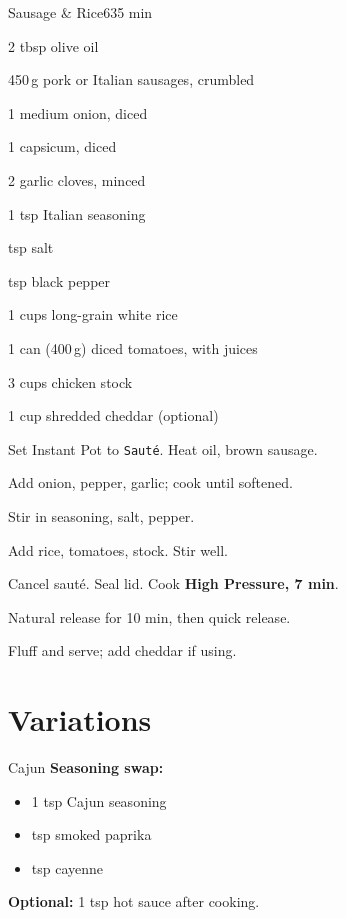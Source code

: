 \begin{recipebox}{Sausage \& Rice}{6}{35 min}

\begin{ingredients}
  \item 2 tbsp olive oil
  \item 450\,g pork or Italian sausages, crumbled
  \item 1 medium onion, diced
  \item 1 capsicum, diced
  \item 2 garlic cloves, minced
  \item 1 tsp Italian seasoning
  \item {} tsp salt
  \item {} tsp black pepper
  \item 1 cups long-grain white rice
  \item 1 can (400\,g) diced tomatoes, with juices
  \item 3 cups chicken stock
  \item 1 cup shredded cheddar (optional)
\end{ingredients}

\begin{method}
  \item Set Instant Pot to \texttt{Sauté}. Heat oil, brown sausage.
  \item Add onion, pepper, garlic; cook until softened.
  \item Stir in seasoning, salt, pepper.
  \item Add rice, tomatoes, stock. Stir well.
  \item Cancel sauté. Seal lid. Cook \textbf{High Pressure, 7 min}.
  \item Natural release for 10 min, then quick release.
  \item Fluff and serve; add cheddar if using.
\end{method}

\section*{Variations}

\begin{variationbox}{Cajun}
  \textbf{Seasoning swap:}
  \begin{itemize}
    \item 1 tsp Cajun seasoning
    \item {} tsp smoked paprika
    \item {} tsp cayenne
  \end{itemize}
  \textbf{Optional:} 1 tsp hot sauce after cooking.
\end{variationbox}


\end{recipebox}
